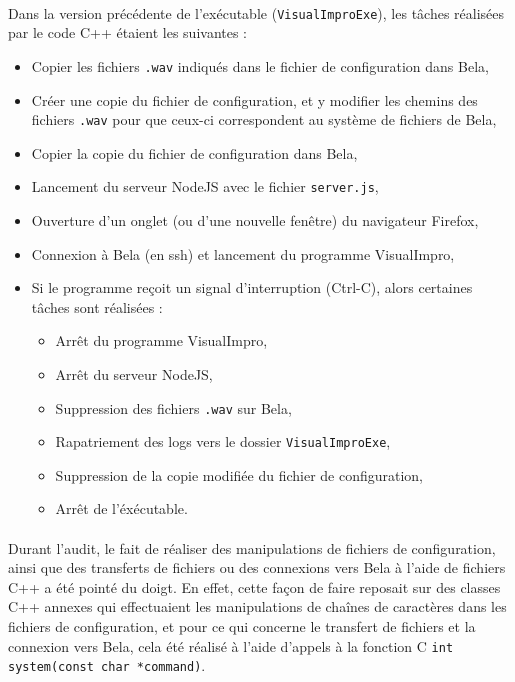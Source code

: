 \paragraph{}
Dans la version précédente de l'exécutable (\verb!VisualImproExe!),
les tâches réalisées par le code C++ étaient les suivantes :
\begin{itemize}
  \item Copier les fichiers \verb!.wav! indiqués dans le fichier de
    configuration dans Bela,
  \item Créer une copie du fichier de configuration, et y modifier les
    chemins des fichiers \verb!.wav! pour que ceux-ci correspondent au
    système de fichiers de Bela,
  \item Copier la copie du fichier de configuration dans Bela,
  \item Lancement du serveur NodeJS avec le fichier \verb!server.js!,
  \item Ouverture d'un onglet (ou d'une nouvelle fenêtre) du
    navigateur Firefox,
  \item Connexion à Bela (en ssh) et lancement du programme
    VisualImpro,
  \item Si le programme reçoit un signal d'interruption (Ctrl-C),
    alors certaines tâches sont réalisées :
  \begin{itemize}
    \item Arrêt du programme VisualImpro,
    \item Arrêt du serveur NodeJS,
    \item Suppression des fichiers \verb!.wav! sur Bela,
    \item Rapatriement des logs vers le dossier \verb!VisualImproExe!,
    \item Suppression de la copie modifiée du fichier de configuration,
    \item Arrêt de l'éxécutable.
  \end{itemize}
\end{itemize}
\paragraph{}
Durant l'audit, le fait de réaliser des manipulations de fichiers de
configuration, ainsi que des transferts de fichiers ou des connexions
vers Bela à l'aide de fichiers C++ a été pointé du doigt. En effet,
cette façon de faire reposait sur des classes C++ annexes qui
effectuaient les manipulations de chaînes de caractères dans les
fichiers de configuration, et pour ce qui concerne le transfert de
fichiers et la connexion vers Bela, cela été réalisé à l'aide d'appels
à la fonction C \verb!int system(const char *command)!.
